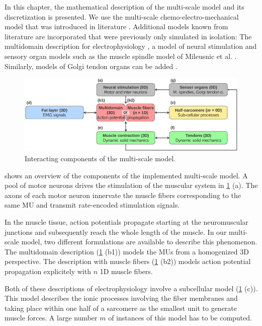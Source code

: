 
In this chapter, the mathematical description of the multi-scale model and its discretization is presented. 
We use the multi-scale chemo-electro-mechanical model that was introduced in literature \cite{Roehrle2012,Heidlauf2013,Heidlauf2015Diss,Mordhorst2015}. Additional models known from literature are incorporated that  were previously only simulated in isolation: The multidomain description for electrophysiology \cite{Klotz2020}, a model of neural stimulation \cite{Cisi2008} and sensory organ models such as the muscle spindle model of Mileusnic et al. \cite{Mileusnic2006Spindle}. Similarly, models of Golgi tendon organs can be added \cite{Mileusnic2006Golgi}.

\begin{figure}%
  \centering%
  \includegraphics[width=\textwidth]{images/theory/model_schematic.pdf}%
  \caption{Interacting components of the multi-scale model.}%
  \label{fig:multi-scale-model}%
\end{figure}

 shows an overview of the components of the implemented multi-scale model.
A pool of motor neurons drives the stimulation of the muscular system in \cref{fig:multi-scale-model} (a). 
The axons of each motor neuron innervate the muscle fibers corresponding to the same MU and transmit rate-encoded stimulation signals.

In the muscle tissue, action potentials propagate starting at the neuromuscular junctions and subsequently reach the whole length of the muscle.
In our multi-scale model, two different formulations are available to describe this phenomenon. The multidomain description (\cref{fig:multi-scale-model} (b1)) models the MUs from a  homogenized 3D perspective. The description with muscle fibers (\cref{fig:multi-scale-model} (b2)) models action potential propagation explicitely with $n$ 1D muscle fibers. 

Both of these descriptions of electrophysiology involve a subcellular model (\cref{fig:multi-scale-model} (c)). This model describes the ionic processes involving the fiber membranes and taking place within one half of a sarcomere as the smallest unit to generate muscle forces. A large number $m$ of instances of this model has to be computed. 

